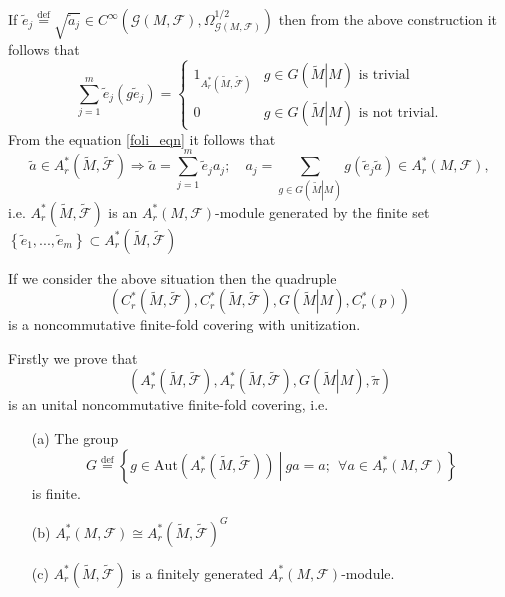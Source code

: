 \documentclass{beamer}
\theoremstyle{plain}
\newcommand{\be}{\begin{equation}}
\newcommand{\ee}{\end{equation}}
\newcommand{\Aut}{\mathrm{Aut}}
\newcommand{\sF}{\mathcal{F}}       %
\newcommand{\bydef}{\stackrel{\mathrm{def}}{=}}
\begin{document}
\begin{frame}
If $\widetilde e_j \bydef \sqrt{\widetilde a_j}\in C^{\infty} \left(\mathcal G\left( M, \sF\right) , \Omega_{\mathcal G\left( M, \sF\right)}^{1/2}\right)$ then from the above construction it follows that
\be\label{foli_eqn}
\sum_{j = 1}^m \widetilde e_j (g \widetilde e_j)= \begin{cases}
	1_{A^*_r \left(\widetilde M, \widetilde{\sF}\right)} &  g\in G\left(\left.\widetilde M\right| M\right)\text{ is trivial}\\
		0 &  g\in G\left(\left.\widetilde M\right| M\right)\text{ is not  trivial}.
\end{cases}
\ee
From the equation \eqref{foli_eqn} it follows that
$$
\widetilde a \in A^*_r \left(\widetilde M, \widetilde{\sF}\right)\Rightarrow \widetilde a = \sum_{j=1}^m \widetilde e_j a_j; \quad a_j= \sum_{g \in G\left(\left.\widetilde M\right| M\right)} g\left(  \widetilde e_j  \widetilde a\right)\in A^*_r \left( M, {\sF}\right), 
$$
i.e. $A^*_r \left(\widetilde M, \widetilde{\sF}\right)$ is an $A^*_r \left( M, {\sF}\right)$-module generated by the finite set $\left\{\widetilde e_1, ..., \widetilde e_m\right\}\subset A^*_r \left(\widetilde M, \widetilde{\sF}\right)$
\end{frame}
\begin{frame}
\begin{theorem}
If we consider the above situation then the quadruple
$$
\left(C^*_r \left(\widetilde M, \widetilde{\sF}\right), C^*_r \left(\widetilde M, \widetilde{\sF}\right), G\left(\left.\widetilde M\right| M\right), C^*_r\left(p \right) \right)
$$
is a noncommutative finite-fold covering with unitization.
\end{theorem}
Firstly we prove that
	$$
	\left(A^*_r \left(\widetilde M, \widetilde{\sF}\right), A^*_r \left(\widetilde M, \widetilde{\sF}\right), G\left(\left.\widetilde M\right| M\right), \widetilde\pi \right)
	$$
is an unital noncommutative finite-fold covering, i.e.
			\begin{enumerate}
		\item[(a)] The group  
		$$
		G \bydef \left\{ \left.g \in \Aut\left(A^*_r \left(\widetilde M, \widetilde{\sF}\right) \right)~\right|~ ga = a;~~\forall a \in A^*_r \left( M, {\sF}\right)\right\}
		$$
		is finite.
		\item[(b)] 	$
		A^*_r\left( M, {\sF}\right) \cong A^*_r \left(\widetilde M, \widetilde{\sF}\right)^G$
			\item[(c)] $A^*_r \left(\widetilde M, \widetilde{\sF}\right)$ is a finitely generated $A^*_r \left( M, {\sF}\right)$-module.
	\end{enumerate}
\end{frame}
\end{document}
